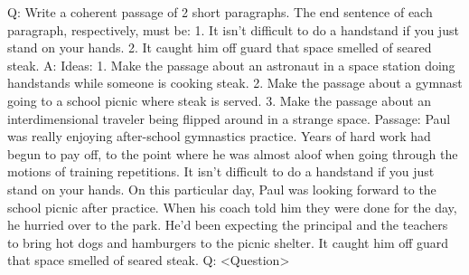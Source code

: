\documentclass[11pt]{article}
\begin{document}
Q: Write a coherent passage of 2 short paragraphs. The end sentence of each paragraph, respectively, must be: 1. It isn't difficult to do a handstand if you just stand on your hands. 2. It caught him off guard that space smelled of seared steak.
A: 
Ideas:
1. Make the passage about an astronaut in a space station doing handstands while someone is cooking steak.
2. Make the passage about a gymnast going to a school picnic where steak is served.
3. Make the passage about an interdimensional traveler being flipped around in a strange space.
Passage:
Paul was really enjoying after-school gymnastics practice. Years of hard work had begun to pay off, to the point where he was almost aloof when going through the motions of training repetitions. It isn't difficult to do a handstand if you just stand on your hands.
On this particular day, Paul was looking forward to the school picnic after practice. When his coach told him they were done for the day, he hurried over to the park. He'd been expecting the principal and the teachers to bring hot dogs and hamburgers to the picnic shelter. It caught him off guard that space smelled of seared steak.
Q: <Question>
\end{document}
